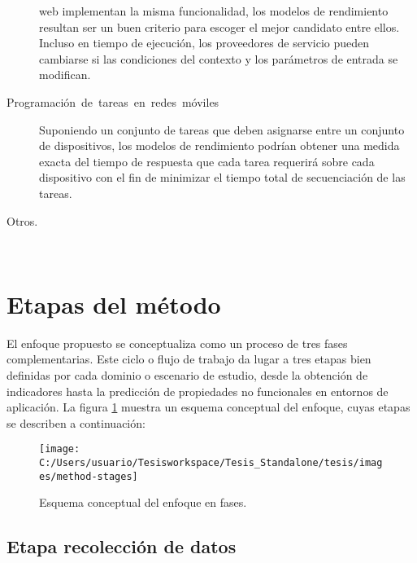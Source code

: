 \begin{description}
web implementan la misma funcionalidad, los modelos de rendimiento
resultan ser un buen criterio para escoger el mejor candidato entre
ellos. Incluso en tiempo de ejecución, los proveedores de servicio
pueden cambiarse si las condiciones del contexto y los parámetros
de entrada se modifican. 
\item [{Programación~de~tareas~en~redes~móviles}] Suponiendo un conjunto
de tareas que deben asignarse entre un conjunto de dispositivos, los
modelos de rendimiento podrían obtener una medida exacta del tiempo
de respuesta que cada tarea requerirá sobre cada dispositivo con el
fin de minimizar el tiempo total de secuenciación de las tareas. 
\item [{Otros.}]~
\end{description}

\section{Etapas del método\label{sec:Etapas-del-m=0000E9todo}}

El enfoque propuesto se conceptualiza como un proceso de tres fases
complementarias. Este ciclo o flujo de trabajo da lugar a tres etapas
bien definidas por cada dominio o escenario de estudio, desde la obtención
de indicadores hasta la predicción de propiedades no funcionales en
entornos de aplicación. La figura \ref{fig:method-stages} muestra
un esquema conceptual del enfoque, cuyas etapas se describen a continuación:

\begin{figure}
\begin{centering}
\texttt{[image: C:/Users/usuario/Tesisworkspace/Tesis\_Standalone/tesis/images/method-stages]}
\par\end{centering}

\caption{Esquema conceptual del enfoque en fases. \label{fig:method-stages}}
\end{figure}



\subsection{Etapa recolección de datos }

